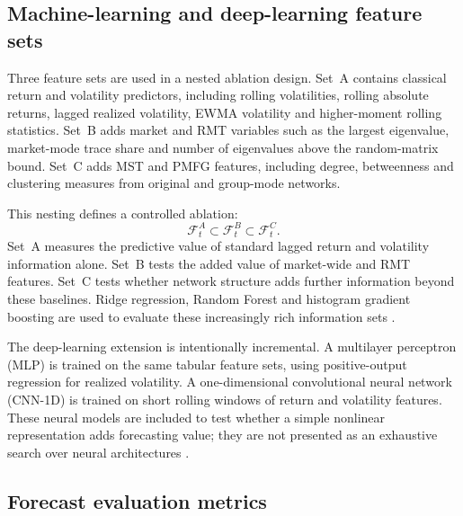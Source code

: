 \subsection{Machine-learning and deep-learning feature sets}
\label{subsec:forecast_models_method}

Three feature sets are used in a nested ablation design. Set~A contains classical return and volatility predictors, including rolling volatilities, rolling absolute returns, lagged realized volatility, EWMA volatility and higher-moment rolling statistics. Set~B adds market and RMT variables such as the largest eigenvalue, market-mode trace share and number of eigenvalues above the random-matrix bound. Set~C adds MST and PMFG features, including degree, betweenness and clustering measures from original and group-mode networks.

This nesting defines a controlled ablation:
\begin{equation}
\mathcal{F}^{A}_{t}
\subset
\mathcal{F}^{B}_{t}
\subset
\mathcal{F}^{C}_{t}.
\end{equation}
Set~A measures the predictive value of standard lagged return and volatility information alone. Set~B tests the added value of market-wide and RMT features. Set~C tests whether network structure adds further information beyond these baselines. Ridge regression, Random Forest and histogram gradient boosting are used to evaluate these increasingly rich information sets \cite{hoerl_kennard_1970_ridge,breiman_2001_random,friedman_2001_greedy}.

The deep-learning extension is intentionally incremental. A multilayer perceptron (MLP) is trained on the same tabular feature sets, using positive-output regression for realized volatility. A one-dimensional convolutional neural network (CNN-1D) is trained on short rolling windows of return and volatility features. These neural models are included to test whether a simple nonlinear representation adds forecasting value; they are not presented as an exhaustive search over neural architectures \cite{bucci_2020_realized,christensen_2022_realized}.

\subsection{Forecast evaluation metrics}
\label{subsec:evaluation_method}

